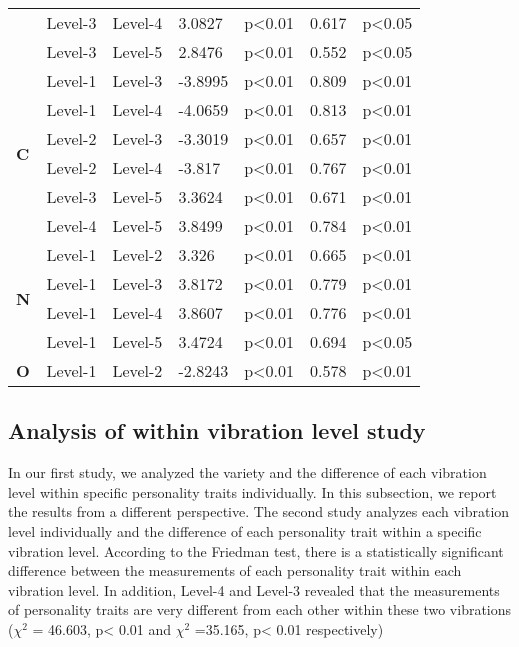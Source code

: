 \begin{longtable}{ |p{0.5cm}| p{1.5cm}|p{1.5cm}|p{1.3cm}| p{1.6cm}|p{1cm}|p{1.5cm}|  }
&Level-3		&Level-4			&3.0827			&p<0.01			&0.617 		&p<0.05\\
&Level-3		&Level-5			&2.8476			&p<0.01			&0.552		&p<0.05\\
\hline 
\hline 
\multirow{6}{*}{\textbf{C}} 
&Level-1		&Level-3			&-3.8995			&p<0.01			&0.809 		&p<0.01\\
&Level-1		&Level-4			&-4.0659			&p<0.01			&0.813 		&p<0.01\\
&Level-2		&Level-3			&-3.3019			&p<0.01			&0.657		&p<0.01\\
&Level-2		&Level-4			&-3.817			&p<0.01			&0.767 		&p<0.01\\
&Level-3		&Level-5			&3.3624			&p<0.01			&0.671 		&p<0.01\\
&Level-4		&Level-5			&3.8499			&p<0.01			&0.784 		&p<0.01\\
\hline 
\hline 
\multirow{4}{*}{\textbf{N}} 
&Level-1		&Level-2			&3.326			&p<0.01			&0.665 		&p<0.01\\
&Level-1		&Level-3			&3.8172			&p<0.01			&0.779 		&p<0.01\\
&Level-1		&Level-4			&3.8607			&p<0.01			&0.776  		&p<0.01\\
&Level-1		&Level-5			&3.4724			&p<0.01			&0.694		&p<0.05\\
\hline 
\hline 
\multirow{1}{*}{\textbf{O}} 
&Level-1		&Level-2			&-2.8243			&p<0.01			&0.578 		&p<0.01\\
\hline 
\end{longtable}

\subsection{Analysis of within vibration level study}
\label{Study2(M-M)}
In our first study, we analyzed the variety and the difference of each vibration level within specific personality
traits individually. In this subsection, we report the results from a different perspective. The second study analyzes
each vibration level individually and the difference of each personality trait within a specific vibration level.
According to the Friedman test, there is a statistically significant difference between the measurements of each
personality trait within each vibration level. In addition, Level-4 and Level-3 revealed that the measurements of
personality traits are very different from each other within these two vibrations ($\chi^2$ = 46.603, p< 0.01 and
$\chi^2$ =35.165, p< 0.01 respectively)


